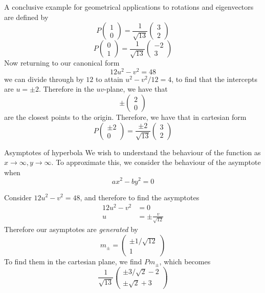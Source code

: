 \documentclass[journal, letterpaper]{IEEEtran}
\begin{document}
\begin{mybox}{A conclusive example for geometrical applications to rotations and eigenvectors}
        are defined by
        $$ P\begin{pmatrix}
            1 \\ 0
        \end{pmatrix} = \frac{1}{\sqrt{13}}\begin{pmatrix}
            3 \\ 2
        \end{pmatrix}$$
        $$ P\begin{pmatrix}
            0 \\ 1
        \end{pmatrix} = \frac{1}{\sqrt{13}}\begin{pmatrix}
            -2 \\ 3
        \end{pmatrix}$$
        Now returning to our canonical form
        $$ 12u^2 - v^2 = 48$$
        we can divide through by $12$ to attain $u^2 - v^2/12 = 4$, to find that the intercepts are
        $u = \pm 2$. Therefore in the $uv$-plane, we have that 
        $$ \pm\begin{pmatrix}
            2 \\ 0
        \end{pmatrix}$$
        are the closest points to the origin. Therefore, we have that in cartesian form
        $$ P\begin{pmatrix}
            \pm 2 \\ 0
        \end{pmatrix} = \frac{\pm 2}{\sqrt{13}}\begin{pmatrix}
            3 \\ 2
        \end{pmatrix}
        $$
        \begin{myboxr}{Asymptotes of hyperbola}
            We wish to understand the behaviour of the function as $x \to \infty, y\to\infty$. To approximate this, we 
            consider the behaviour of the asymptote when 
            $$ax^2 - by^2 = 0 $$
        \end{myboxr}
        Consider $12u^2 - v^2 = 48$, and therefore to find the asymptotes
        \begin{align*}
            12u^2 - v^2 &= 0 \\ 
            u &= \pm \frac{v}{\sqrt{12}}
        \end{align*}
        Therefore our asymptotes are \textit{generated} by
        $$ m_{\pm} = \begin{pmatrix}
            \pm 1/\sqrt{12} \\ 1
        \end{pmatrix}$$
        To find them in the cartesian plane, we find $Pm_{\pm}$, which becomes
        $$
            \frac{1}{\sqrt{13}}\begin{pmatrix}
                \pm 3/\sqrt{2} - 2 \\ \pm\sqrt{2} + 3
            \end{pmatrix}
        $$
    \end{mybox}
\end{document}
